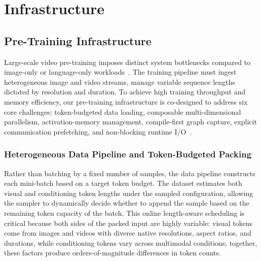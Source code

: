 \section{Infrastructure} \label{sec:infrastructure}

\subsection{Pre-Training Infrastructure}
Large-scale video pre-training imposes distinct system bottlenecks compared to image-only or language-only workloads~\cite{ho2022imagen,blattmann2023stable,wan2025wan,chowdhery2022palmscalinglanguagemodeling}.
The training pipeline must ingest heterogeneous image and video streams, manage variable sequence lengths dictated by resolution and duration.
To achieve high training throughput and memory efficiency, our pre-training infrastructure is co-designed to address six core challenges: token-budgeted data loading, composable multi-dimensional parallelism, activation-memory management, compile-first graph capture, explicit communication prefetching, and non-blocking runtime I/O~\cite{shoeybi2019megatronlm,narayanan2021efficient,rajbhandari2020zero,zheng2022alpa,liang2025torchtitan,ma2025veomni}.

\subsubsection{Heterogeneous Data Pipeline and Token-Budgeted Packing}
Rather than batching by a fixed number of samples, the data pipeline constructs each mini-batch based on a target token budget. The dataset estimates both visual and conditioning token lengths under the sampled configuration, allowing the sampler to dynamically decide whether to append the sample based on the remaining token capacity of the batch. This online length-aware scheduling is critical because both sides of the packed input are highly variable: visual tokens come from images and videos with diverse native resolutions, aspect ratios, and durations, while conditioning tokens vary across multimodal conditions; together, these factors produce orders-of-magnitude differences in token counts.

